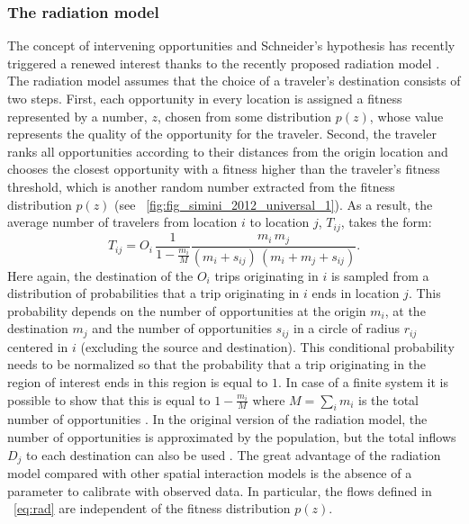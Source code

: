 \subsubsection{The radiation model}
\label{sec:radiation}

The concept of intervening opportunities and Schneider's hypothesis has recently triggered a renewed interest thanks to the recently proposed radiation model \cite{simini_2012_universal}. The radiation model assumes that the choice of a traveler's destination consists of two steps. 
First, each opportunity in every location is assigned a fitness represented by a number, $z$, chosen from some distribution $p(z)$, whose value represents the quality of the opportunity for the traveler. 
Second, the traveler ranks all opportunities according to their distances from the origin location and chooses the closest opportunity with a fitness higher than the traveler's fitness threshold, which is another random number extracted from the fitness distribution $p(z)$ (see \figurename~\ref{fig:fig_simini_2012_universal_1}). 
As a result, the average number of travelers from location $i$ to location $j$, $T_{ij}$, takes the form:
\begin{equation}
   T_{ij}=O_i \, \frac{1}{1-\frac{m_i}{M}} \frac{m_i \, m_j}{(m_i+s_{ij})\, (m_i+m_j+s_{ij})} .
	\label{eq:rad}
\end{equation}
Here again, the destination of the $O_i$ trips originating in $i$ is sampled from a distribution of probabilities that a trip originating in $i$ ends in location $j$. This probability depends on the number of opportunities at the origin $m_i$, at the destination $m_j$ and the number of opportunities $s_{ij}$ in a circle of radius $r_{ij}$ centered in $i$ (excluding the source and destination). This conditional probability needs to be normalized so that the probability that a trip originating in the region of interest ends in this region is equal to $1$. In case of a finite system it is possible to show that this is equal to $1-\frac{m_i}{M}$ where $M = \sum_i m_i$ is the total number of opportunities \cite{masucci_2013_gravity}. In the original version of the radiation model, the number of opportunities is approximated by the population, but the total inflows $D_j$ to each destination can also be used \cite{lenormand_2012_universal, masucci_2013_gravity, lenormand_2015_systematic}. The great advantage of the radiation model compared with other spatial interaction models is the absence of a parameter to calibrate with observed data.  In particular, the flows defined in \equationname~\eqref{eq:rad} are independent of the fitness distribution $p(z)$.
